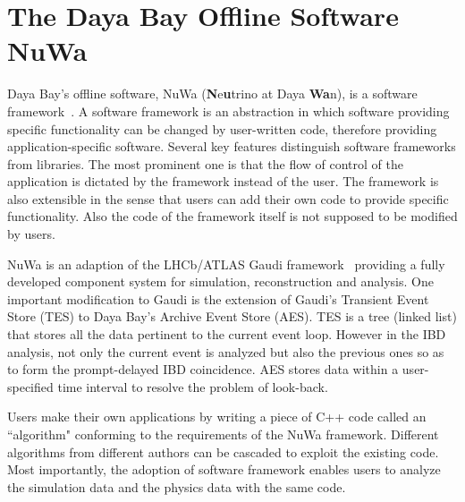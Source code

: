 \section{The Daya Bay Offline Software NuWa}
Daya Bay's offline software, NuWa (\textbf{N}e\textbf{u}trino at Daya \textbf{Wa}n), is a software framework~\cite{oum}. A software framework is an abstraction in which software providing specific functionality can be changed by user-written code, therefore providing application-specific software. Several key features distinguish software frameworks from libraries. The most prominent one is that the flow of control of the application is dictated by the framework instead of the user. The framework is also extensible in the sense that users can add their own code to provide specific functionality. Also the code of the framework itself is not supposed to be modified by users.

NuWa is an adaption of the LHCb/ATLAS Gaudi framework~\cite{gaudi} providing a fully developed component system for simulation, reconstruction and analysis. One important modification to Gaudi is the extension of Gaudi's Transient Event Store (TES) to Daya Bay's Archive Event Store (AES). TES is a tree (linked list) that stores all the data pertinent to the current event loop. However in the IBD analysis, not only the current event is analyzed but also the previous ones so as to form the prompt-delayed IBD coincidence. AES stores data within a user-specified time interval to resolve the problem of look-back.

Users make their own applications by writing a piece of C++ code called an ``algorithm" conforming to the requirements of the NuWa framework. Different algorithms from different authors can be cascaded to exploit the existing code. Most importantly, the adoption of software framework enables users to analyze the simulation data and the physics data with the same code.

